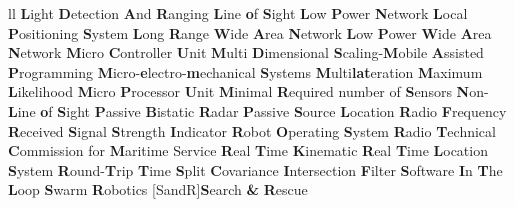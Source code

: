 \documentclass[
	12pt, %
	english, %
	onehalfspacing, %
	liststotoc, %
	toctotoc, %
	parskip, %
	headsepline, %
]{MastersDoctoralThesis} %
\begin{document}
\begin{abbreviations}{ll}
			{\textbf{L}ight \textbf{D}etection \textbf{A}nd \textbf{R}anging}
			{\textbf{L}ine   \textbf{o}f \textbf{S}ight}
			{\textbf{L}ow \textbf{P}ower \textbf{N}etwork}
			{\textbf{L}ocal \textbf{P}ositioning \textbf{S}ystem}
		{\textbf{L}ong \textbf{R}ange \textbf{W}ide \textbf{A}rea \textbf{N}etwork}
			{\textbf{L}ow \textbf{P}ower \textbf{W}ide \textbf{A}rea \textbf{N}etwork}
			{\textbf{M}icro \textbf{C}ontroller \textbf{U}nit}
		{\textbf{M}ulti \textbf{D}imensional \textbf{S}caling-\textbf{M}obile \textbf{A}ssisted \textbf{P}rogramming}
			{\textbf{M}icro-\textbf{e}lectro-\textbf{m}echanical \textbf{S}ystems}
			{\textbf{M}ulti\textbf{lat}eration}
				{\textbf{M}aximum \textbf{L}ikelihood}
			{\textbf{M}icro \textbf{P}rocessor \textbf{U}nit}
			{\textbf{M}inimal \textbf{R}equired number of \textbf{S}ensors}
			{\textbf{N}on-\textbf{L}ine \textbf{o}f \textbf{S}ight}
			{\textbf{P}assive \textbf{B}istatic \textbf{R}adar}
			{\textbf{P}assive \textbf{S}ource \textbf{L}ocation}
		   		{\textbf{R}adio \textbf{F}requency}
			{\textbf{R}eceived \textbf{S}ignal \textbf{S}trength \textbf{I}ndicator}
			{\textbf{R}obot \textbf{O}perating \textbf{S}ystem}
			{\textbf{R}adio \textbf{T}echnical \textbf{C}ommission for \textbf{M}aritime Service}
			{\textbf{R}eal \textbf{T}ime \textbf{K}inematic}
			{\textbf{R}eal \textbf{T}ime \textbf{L}ocation \textbf{S}ystem}
			{\textbf{R}ound-\textbf{T}rip \textbf{T}ime}
			{\textbf{S}plit \textbf{C}ovariance \textbf{I}ntersection \textbf{F}ilter}
			{\textbf{S}oftware \textbf{I}n \textbf{T}he \textbf{L}oop}
				{\textbf{S}warm \textbf{R}obotics}
	[SandR]{\textbf{S}earch \textbf{\&} \textbf{R}escue}

\end{abbreviations}
\end{document}
